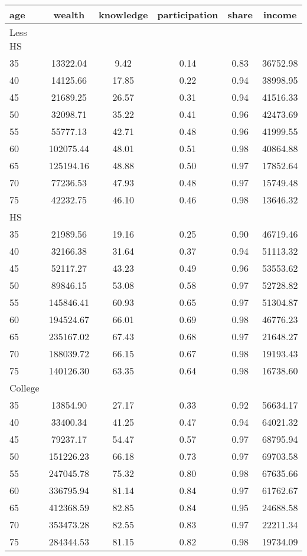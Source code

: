  \begin{tabular}{lccccc}
 \hline \hline
  age & wealth & knowledge & participation & share & income \\
 \hline
 Less HS & & & & & \\
 \hline
35 &  13322.04 &      9.42 &      0.14 &      0.83 &  36752.98 \\ 
40 &  14125.66 &     17.85 &      0.22 &      0.94 &  38998.95 \\ 
45 &  21689.25 &     26.57 &      0.31 &      0.94 &  41516.33 \\ 
50 &  32098.71 &     35.22 &      0.41 &      0.96 &  42473.69 \\ 
55 &  55777.13 &     42.71 &      0.48 &      0.96 &  41999.55 \\ 
60 & 102075.44 &     48.01 &      0.51 &      0.98 &  40864.88 \\ 
65 & 125194.16 &     48.88 &      0.50 &      0.97 &  17852.64 \\ 
70 &  77236.53 &     47.93 &      0.48 &      0.97 &  15749.48 \\ 
75 &  42232.75 &     46.10 &      0.46 &      0.98 &  13646.32 \\ 
 \hline
 HS & & & & & \\
 \hline
35 &  21989.56 &     19.16 &      0.25 &      0.90 &  46719.46 \\ 
40 &  32166.38 &     31.64 &      0.37 &      0.94 &  51113.32 \\ 
45 &  52117.27 &     43.23 &      0.49 &      0.96 &  53553.62 \\ 
50 &  89846.15 &     53.08 &      0.58 &      0.97 &  52728.82 \\ 
55 & 145846.41 &     60.93 &      0.65 &      0.97 &  51304.87 \\ 
60 & 194524.67 &     66.01 &      0.69 &      0.98 &  46776.23 \\ 
65 & 235167.02 &     67.43 &      0.68 &      0.97 &  21648.27 \\ 
70 & 188039.72 &     66.15 &      0.67 &      0.98 &  19193.43 \\ 
75 & 140126.30 &     63.35 &      0.64 &      0.98 &  16738.60 \\ 
 \hline
 College & & & & & \\
 \hline
35 &  13854.90 &     27.17 &      0.33 &      0.92 &  56634.17 \\ 
40 &  33400.34 &     41.25 &      0.47 &      0.94 &  64021.32 \\ 
45 &  79237.17 &     54.47 &      0.57 &      0.97 &  68795.94 \\ 
50 & 151226.23 &     66.18 &      0.73 &      0.97 &  69703.58 \\ 
55 & 247045.78 &     75.32 &      0.80 &      0.98 &  67635.66 \\ 
60 & 336795.94 &     81.14 &      0.84 &      0.97 &  61762.67 \\ 
65 & 412368.59 &     82.85 &      0.84 &      0.95 &  24688.58 \\ 
70 & 353473.28 &     82.55 &      0.83 &      0.97 &  22211.34 \\ 
75 & 284344.53 &     81.15 &      0.82 &      0.98 &  19734.09 \\ 
 \hline \hline
 \end{tabular}
